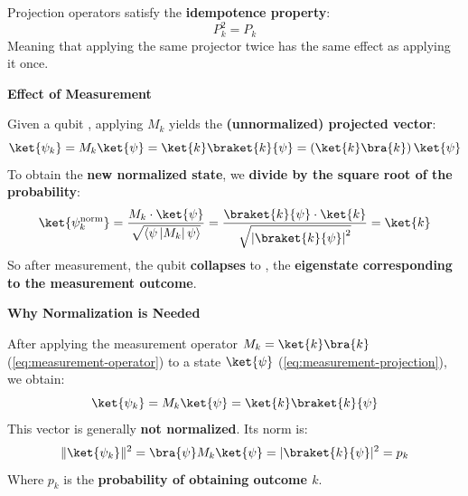 \begin{definitionbox}
    \highspace
    Projection operators satisfy the \textbf{idempotence property}:
    \begin{equation*}
        P_k^2 = P_k
    \end{equation*}
    Meaning that applying the same projector twice has the same effect as applying it once.
\end{definitionbox}

\begin{flushleft}
  \textcolor{Red2}{ \textbf{Effect of Measurement}}
\end{flushleft}
Given a qubit \ket{\psi}, applying $M_{k}$ yields the \textbf{(unnormalized) projected vector}:
\begin{equation}\label{eq:measurement-projection}
  \ket{\psi_{k}} = M_{k} \ket{\psi} = \ket{k} \braket{k}{\psi} = \left(\ket{k} \bra{k}\right) \ket{\psi}
\end{equation}
To obtain the \textbf{new normalized state}, we \textbf{divide by the square root of the probability}:
\begin{equation}\label{eq:measurement-normalization}
  \ket{\psi_{k}^{\text{norm}}} =
  \dfrac{M_{k} \cdot \ket{\psi}}{\sqrt{\left\langle \psi \left| M_{k} \right| \psi \right\rangle}} =
  \dfrac{\braket{k}{\psi} \cdot \ket{k}}{\sqrt{\left|\braket{k}{\psi}\right|^{2}}} =
  \ket{k}
\end{equation}
So after measurement, the qubit \textbf{collapses} to , the \textbf{eigenstate corresponding to the measurement outcome}.

\highspace
\begin{flushleft}
  \textcolor{Green3}{ \textbf{Why Normalization is Needed}}
\end{flushleft}
After applying the measurement operator $M_k = \ket{k}\bra{k}$ (\autoref{eq:measurement-operator}) to a state $\ket{\psi}$ (\autoref{eq:measurement-projection}), we obtain:
\begin{equation*}
  \ket{\psi_k} = M_k \ket{\psi} = \ket{k}\braket{k}{\psi}
\end{equation*}
This vector is generally \textbf{not normalized}. Its norm is:
\begin{equation*}
  \|\ket{\psi_k}\|^2 = \bra{\psi} M_k \ket{\psi} = |\braket{k}{\psi}|^2 = p_k
\end{equation*}
Where $p_k$ is the \textbf{probability of obtaining outcome $k$}.

